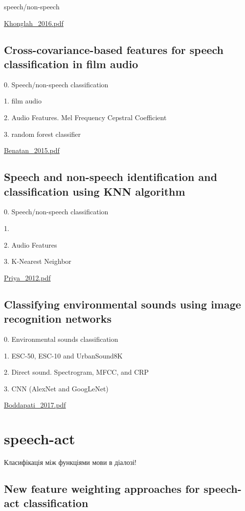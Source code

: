 speech/non-speech

\url{Khonglah_2016.pdf}\cite{Khonglah_2016}

\subsection{Cross-covariance-based features for speech classification in film audio}

0. Speech/non-speech classification

1. film audio

2. Audio Features.  Mel Frequency Cepstral Coefficient

3. random forest classifier

\url{Benatan_2015.pdf}\cite{Benatan_2015}

\subsection{Speech and non-speech identification and classification using KNN algorithm}

0. Speech/non-speech classification

1. 

2. Audio Features

3. K-Nearest Neighbor

\url{Priya_2012.pdf}\cite{Priya_2012}

\subsection{Classifying environmental sounds using image recognition networks}

0. Environmental sounds classification

1. ESC-50, ESC-10 and UrbanSound8K

2. Direct sound. Spectrogram, MFCC, and CRP

3. CNN (AlexNet and GoogLeNet)

\url{Boddapati_2017.pdf}\cite{Boddapati_2017}

\section{speech-act}

Класифікація між функціями мови в діалозі!

\subsection{New feature weighting approaches for speech-act classification}

